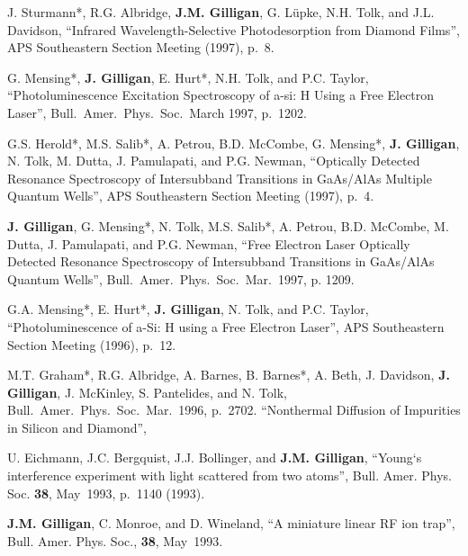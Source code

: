 \item
  J. Sturmann*, R.G. Albridge, \textbf{J.M. Gilligan}, G. L\"upke, N.H. Tolk, and J.L. Davidson,
  \enquote{Infrared Wavelength-Selective Photodesorption from Diamond Films},
  APS Southeastern Section Meeting (1997), p.~8.

\item
  G. Mensing*, \textbf{J. Gilligan}, E. Hurt*, N.H. Tolk, and P.C. Taylor,
  \enquote{Photoluminescence Excitation Spectroscopy of a-si: H Using a Free Electron Laser},
Bull.\ Amer.\ Phys.\ Soc.\ March 1997, p.~1202.

\item
  G.S. Herold*, M.S. Salib*, A. Petrou, B.D. McCombe, G. Mensing*, \textbf{J. Gilligan}, N. Tolk, M. Dutta, J. Pamulapati, and P.G. Newman,
  \enquote{Optically Detected Resonance Spectroscopy of Intersubband Transitions in GaAs/AlAs Multiple Quantum Wells},
  APS Southeastern Section Meeting (1997), p.~4.

\item
  \textbf{J. Gilligan}, G. Mensing*, N. Tolk, M.S. Salib*, A. Petrou, B.D. McCombe, M. Dutta, J. Pamulapati, and P.G. Newman,
  \enquote{Free Electron Laser Optically Detected Resonance Spectroscopy of Intersubband Transitions in GaAs/AlAs Quantum Wells}, 
  Bull.\ Amer.\ Phys.\ Soc.\ Mar.~1997, p. 1209.

\item
  G.A. Mensing*, E. Hurt*, \textbf{J. Gilligan}, N. Tolk, and P.C. Taylor,
  \enquote{Photoluminescence of a-Si: H using a Free Electron Laser},
  APS Southeastern Section Meeting (1996), p.~12.


\item
  M.T. Graham*, R.G. Albridge, A. Barnes, B. Barnes*, A. Beth, J. Davidson, \textbf{J. Gilligan}, J. McKinley, S. Pantelides, and N. Tolk, Bull.\ Amer.\ Phys.\ Soc.\ Mar.~1996, p.~2702.
  \enquote{Nonthermal Diffusion of Impurities in Silicon and Diamond},
  
 \item
 U. Eichmann, J.C. Bergquist, J.J. Bollinger, and \textbf{J.M. Gilligan},
 \enquote{Young`s interference experiment with light scattered from two atoms},
 Bull. Amer. Phys. Soc. \textbf{38}, May~1993, p.~1140 (1993).

\item
 \textbf{J.M. Gilligan}, C. Monroe, and D. Wineland,
  \enquote{A miniature linear RF ion trap},
  Bull. Amer. Phys. Soc., \textbf{38}, May~1993.

